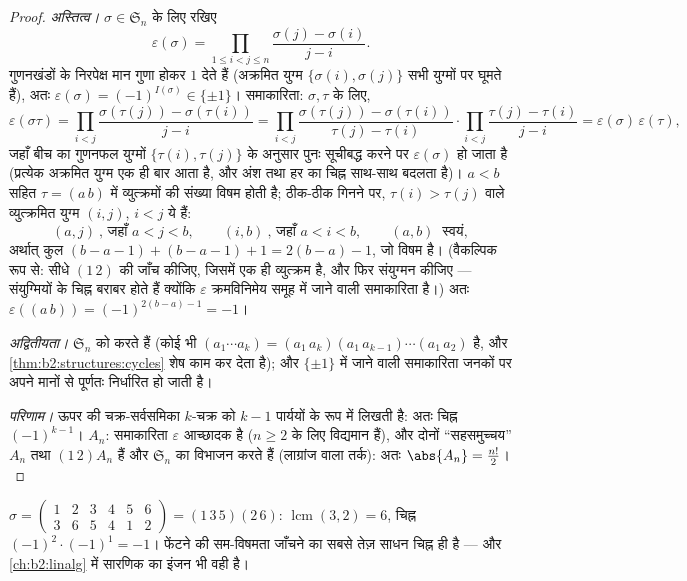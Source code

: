 \begin{proof}
\emph{अस्तित्व।} $\sigma \in \mathfrak{S}_n$ के लिए रखिए
\[
\varepsilon(\sigma)
= \prod_{1 \leq i < j \leq n}
\frac{\sigma(j) - \sigma(i)}{j - i} .
\]
गुणनखंडों के निरपेक्ष मान गुणा होकर $1$ देते हैं (अक्रमित युग्म $\{\sigma(i), \sigma(j)\}$
सभी युग्मों पर घूमते हैं), अतः $\varepsilon(\sigma) = (-1)^{I(\sigma)} \in \{\pm1\}$। समाकारिता: $\sigma, \tau$ के लिए,
\[
\varepsilon(\sigma\tau)
= \prod_{i<j} \frac{\sigma(\tau(j)) - \sigma(\tau(i))}{j - i}
= \prod_{i<j} \frac{\sigma(\tau(j)) - \sigma(\tau(i))}{\tau(j) -
\tau(i)} \cdot \prod_{i<j} \frac{\tau(j) - \tau(i)}{j - i}
= \varepsilon(\sigma)\,\varepsilon(\tau),
\]
जहाँ बीच का गुणनफल युग्मों $\{\tau(i), \tau(j)\}$ के अनुसार पुनः सूचीबद्ध करने पर $\varepsilon(\sigma)$
हो जाता है (प्रत्येक अक्रमित युग्म एक ही बार आता है, और अंश तथा हर का
चिह्न साथ-साथ बदलता है)। $a < b$ सहित  $\tau = (a\,b)$ में व्युत्क्रमों की
संख्या विषम होती है; ठीक-ठीक गिनने पर, $\tau(i) > \tau(j)$ वाले व्युत्क्रमित युग्म
$(i, j)$, $i < j$ ये हैं:
\[
(a, j) \ \text{, जहाँ } a < j < b, \qquad
(i, b) \ \text{, जहाँ } a < i < b, \qquad
(a, b) \ \text{ स्वयं},
\]
अर्थात् कुल $(b - a - 1) + (b - a - 1) + 1 = 2(b - a) - 1$, जो विषम है। (वैकल्पिक रूप से: सीधे $(1\,2)$ की जाँच
कीजिए, जिसमें एक ही व्युत्क्रम है, और फिर संयुग्मन कीजिए --- संयुग्मियों
के चिह्न बराबर होते हैं क्योंकि $\varepsilon$ क्रमविनिमेय समूह में जाने वाली
समाकारिता है।) अतः $\varepsilon((a\,b)) = (-1)^{2(b-a)-1} = -1$।

\emph{अद्वितीयता।}  $\mathfrak{S}_n$ को  करते हैं (कोई भी  $(a_1\cdots a_k) = (a_1\,a_k)(a_1\,a_{k-1})\cdots(a_1\,a_2)$ है, और
\cref{thm:b2:structures:cycles} शेष काम कर देता है); और $\{\pm1\}$ में जाने वाली समाकारिता जनकों पर अपने
मानों से पूर्णतः निर्धारित हो जाती है।

\emph{परिणाम।} ऊपर की चक्र-सर्वसमिका $k$-चक्र को $k - 1$ पार्ययों के रूप
में लिखती है: अतः चिह्न $(-1)^{k-1}$। $A_n$: समाकारिता $\varepsilon$ आच्छादक है ($n \geq 2$ के
लिए  विद्यमान हैं), और दोनों ``सहसमुच्चय'' $A_n$ तथा $(1\,2)A_n$ 
हैं और $\mathfrak{S}_n$ का विभाजन करते हैं (लाग्रांज वाला तर्क): अतः $\abs{A_n} =
\frac{n!}{2}$।
\end{proof}

\begin{example}\label{ex:b2:structures:snexample}
$\sigma = \begin{pmatrix} 1&2&3&4&5&6\\ 3&6&5&4&1&2 \end{pmatrix}
= (1\,3\,5)(2\,6)$:  $\operatorname{lcm}(3,2) = 6$, चिह्न $(-1)^{2}\cdot(-1)^{1} = -1$। फेंटने की सम-विषमता जाँचने का सबसे तेज़
साधन चिह्न ही है --- और \cref{ch:b2:linalg} में सारणिक का इंजन भी वही है।
\end{example}

